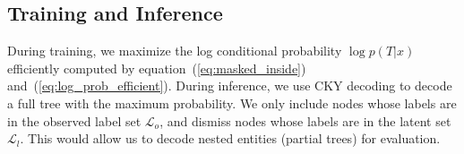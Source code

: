 \subsection{Training and Inference} 
\label{ssec:training_inference}
During training,
we maximize the log conditional probability $\log p(T|x)$ efficiently computed by equation~(\ref{eq:masked_inside}) and~(\ref{eq:log_prob_efficient}).
During inference, we use CKY decoding to decode a full tree with the maximum probability. 
We only include nodes whose labels are in the observed label set $\mathcal{L}_o$, and dismiss nodes whose labels are in the latent set $\mathcal{L}_l$.
This would allow us to decode nested entities (partial trees) for evaluation. 



%

